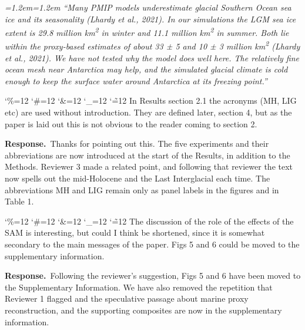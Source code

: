 \documentclass[11pt,a4paper]{article}
\newcommand{\comment}[1]{\par\medskip\noindent\color{black}\begingroup\catcode`\%=12 \catcode`\#=12 \catcode`\&=12 \catcode`\_=12 \catcode`\~=12 \commentbody}
\newcommand{\commentbody}[1]{#1\endgroup\par\smallskip}
\newcommand{\response}{\par\noindent\color{chgcol}\textbf{Response.}\ }
\newenvironment{change}{\par\smallskip\color{chgcol}\small\itshape\leftskip=1.2em\rightskip=1.2em\noindent\ignorespaces}{\par\smallskip}
\begin{document}
\begin{change}
``Many PMIP models underestimate glacial Southern Ocean sea ice and its seasonality (Lhardy et al., 2021). In our simulations the LGM sea ice extent is 29.8 million km\textsuperscript{2} in winter and 11.1 million km\textsuperscript{2} in summer. Both lie within the proxy-based estimates of about 33 ± 5 and 10 ± 3 million km\textsuperscript{2} (Lhardy et al., 2021). We have not tested why the model does well here. The relatively fine ocean mesh near Antarctica may help, and the simulated glacial climate is cold enough to keep the surface water around Antarctica at its freezing point.''
\end{change} %

\comment{R2}{In Results section 2.1 the acronyms (MH, LIG etc) are used without introduction. They are defined later, section 4, but as the paper is laid out this is not obvious to the reader coming to section 2.}

\response Thanks for pointing out this. The five experiments and their abbreviations are now introduced at the start of the Results, in addition to the Methods. Reviewer 3 made a related point, and following that reviewer the text now spells out the mid-Holocene and the Last Interglacial each time. The abbreviations MH and LIG remain only as panel labels in the figures and in Table 1.

\comment{R2}{The discussion of the role of the effects of the SAM is interesting, but could I think be shortened, since it is somewhat secondary to the main messages of the paper. Figs 5 and 6 could be moved to the supplementary information.}

\response Following the reviewer’s suggestion, Figs 5 and 6 have been moved to the Supplementary Information. We have also removed the repetition that Reviewer 1 flagged and the speculative passage about marine proxy reconstruction, and the supporting composites are now in the supplementary information.
 
\end{document}
